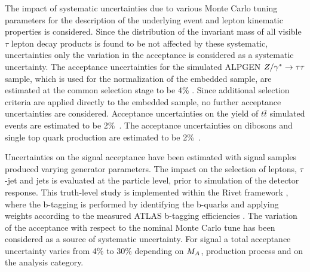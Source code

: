 The impact  of systematic uncertainties due to various Monte Carlo tuning
parameters for the description of the  underlying event and
lepton kinematic properties is considered.
Since the distribution of the invariant mass of all visible $\tau$ lepton decay products is found to be not affected by these systematic,
uncertainties
only the variation in the acceptance is considered as a systematic uncertainty.
The acceptance uncertainties for the simulated ALPGEN $Z/\gamma^*\rightarrow \tau\tau$  sample, which is 
used for the normalization of the embedded sample, 
are estimated at the common selection stage to be 4\% \cite{2010SMLLSupportNote}.
Since additional selection criteria  are applied directly to the embedded sample, 
no further acceptance uncertainties are considered. Acceptance uncertainties on the yield of 
$t\bar{t}$ simulated events are estimated to be  2\%~\cite{ttbaremu}. %
The acceptance uncertainties on dibosons and single top quark production are estimated to be 2\%~\cite{2010SMLLSupportNote}.

Uncertainties on the signal acceptance have been estimated with signal 
samples produced  varying generator parameters. The impact on the selection
 of leptons, $\tau$-jet  and jets is evaluated at the particle level, prior to 
simulation of the detector response. This truth-level study is implemented within the Rivet framework
\cite{RIVET}, where the b-tagging is performed by identifying the b-quarks and applying
 weights according to the measured ATLAS b-tagging
efficiencies \cite{BtaggingScaleFactors}. The variation of the acceptance
with respect to the nominal Monte Carlo tune has  been considered as
a source of systematic uncertainty. For signal a total acceptance 
uncertainty varies from 4\% to 30\% depending on $M_{A}$, production process 
and on the analysis category.

